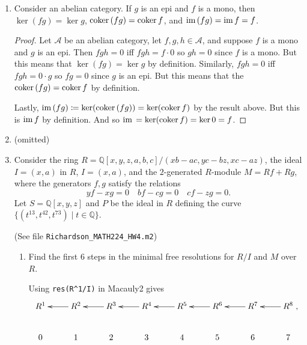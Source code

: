 \documentclass[11pt,oneside,english]{amsart}
\theoremstyle{definition}
\newcommand{\MC}[1]{\mathcal{#1}}
\newcommand{\im}{\text{im\,}}
\newcommand{\coker}{\text{coker\,}}
\begin{document}
\begin{enumerate}[leftmargin=*]
\begin{enumerate}
\item Show that $B \xrightarrow{\, g \,} C \longrightarrow 0$ is exact if and only if $g$ is an epi.

\begin{proof}
First suppose that $B \xrightarrow{\, g \,} C \longrightarrow 0$ is exact. Then $\coker g=C/\im g=0$ so by part (c) $g$ is an epi. Conversely, suppose that $g$ is an epi. We have (i) $0\circ g=0$ by part (b) above and $\coker g=0$ by part (c) above, so $B \xrightarrow{\, g \,} C \longrightarrow 0$ is exact.
\end{proof}
\end{enumerate}

\pagebreak

\item Consider an abelian category. If $g$ is an epi and $f$ is a mono, then $\ker (fg) = \ker g$, $\coker(fg) = \coker f$, and $\im (fg) = \im f = f$.

\begin{proof}
Let $\MC{A}$ be an abelian category, let $f,g,h\in\MC{A}$, and suppose $f$ is a mono and $g$ is an epi. Then $fgh=0$ iff $fgh=f\cdot0$ so $gh=0$ since $f$ is a mono. But this means that $\ker(fg)=\ker g$ by definition. Similarly, $fgh=0$ iff $fgh=0\cdot g$ so $fg=0$ since $g$ is an epi. But this means that the $\coker(fg)=\coker f$ by definition.

Lastly, $\im(fg)\coloneqq\ker(\coker(fg))=\ker(\coker f)$ by the result above. But this is $\im f$ by definition. And so $\im =\ker(\coker f)=\ker 0=f$. 
\end{proof}


\item (omitted)

\pagebreak

\item Consider the ring $R = \mathbb{Q}[x,y,z,a,b,c]/(xb-ac,yc-bz,xc-az)$, the ideal $I = (x,a)$ in $R$, $I = (x,a)$, and the $2$-generated $R$-module $M = Rf + Rg$, where the generators $f, g$ satisfy the relations 
$$yf-xg = 0 \quad bf - cg = 0 \quad cf - zg = 0.$$
Let $S = \mathbb{Q}[x,y,z]$ and $P$ be the ideal in $R$ defining the curve $\lbrace (t^{13},t^{42},t^{73}) \mid t \in \mathbb{Q} \rbrace$.

(See file \verb!Richardson_MATH224_HW4.m2!)
\begin{enumerate}
\item Find the first $6$ steps in the minimal free resolutions for $R/I$ and $M$ over $R$.

Using \verb!res(R^1/I)! in Macauly2 gives
\[
\xymatrix{R^1 & \ar[l] R^2 & \ar[l] R^3 & \ar[l] R^4 & \ar[l] R^5 & \ar[l] R^6 & \ar[l] R^7 & \ar[l] R^8 \\
0 & 1 & 2 & 3 & 4 & 5 & 6 & 7},
\]


\end{enumerate}
\end{enumerate}
\end{document}
